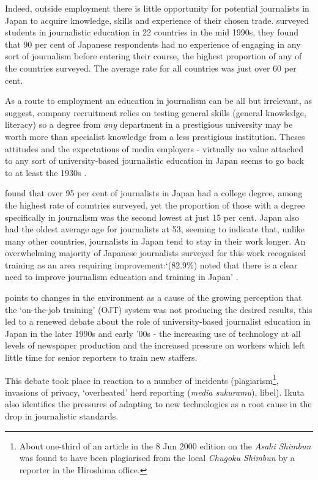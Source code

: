 \documentclass[11pt, headings=normal]{scrartcl}
\begin{document}
Indeed, outside employment there is little opportunity for potential
journalists in Japan to acquire knowledge, skills and experience of
their chosen trade. \textcite[135]{Splichal:1994} surveyed students in
journalistic education in 22 countries in the mid 1990s, they found that
90 per cent of Japanese respondents had no experience of engaging in any
sort of journalism before entering their course, the highest proportion
of any of the countries surveyed. The average rate for all countries was
just over 60 per cent.

As a route to employment an education in journalism can be all but
irrelevant, as \textcite[22]{Cooper-Chen:1997a} suggest, company
recruitment relies on testing general skills (general knowledge,
literacy) so a degree from \emph{any} department in a prestigious
university may be worth more than specialist knowledge from a less
prestigious institution. Theses attitudes and the expectations of media
employers - virtually no value attached to any sort of university-based
journalistic education \autocite[1]{Fujita:2004} in Japan seems to go
back to at least the 1930s \autocite[14]{Uchikawa:2003}.

\textcite[167]{Willnat:2013} found that over 95 per cent of journalists
in Japan had a college degree, among the highest rate of countries
surveyed, yet the proportion of those with a degree specifically in
journalism was the second lowest at just 15 per cent. Japan also had the
oldest average age for journalists at 53, seeming to indicate that,
unlike many other countries, journalists in Japan tend to stay in their
work longer. An overwhelming majority of Japanese journalists surveyed
for this work recognised training as an area requiring
improvement:`(82.9\%) noted that there is a clear need to improve
journalism education and training in Japan' \autocite[ 62]{Oi:2012}.

\textcite{Fujita:2004} points to changes in the environment as a cause
of the growing perception that the `on-the-job training' (OJT) system
was not producing the desired results, this led to a renewed debate
about the role of university-based journalist education in Japan in the
later 1990s and early '00s - the increasing use of technology at all
levels of newspaper production and the increased pressure on workers
which left little time for senior reporters to train new
staffers.\autocite[3]{Fujita:2004}

This debate took place in reaction to a number of incidents
(plagiarism\footnote{About one-third of an article in the 8 Jun 2000
  edition on the \emph{Asahi Shimbun} was found to have been plagiarised
  from the local \emph{Chugoku Shimbun} by a reporter in the Hiroshima
  office.\autocite[137]{Shibata:2003}}, invasions of privacy,
`overheated' herd reporting (\emph{media sukuramu}),
libel)\autocite[1]{Ikuta:2004}. Ikuta also identifies the pressures of
adapting to new technologies as a root cause in the drop in journalistic
standards.
\end{document}
